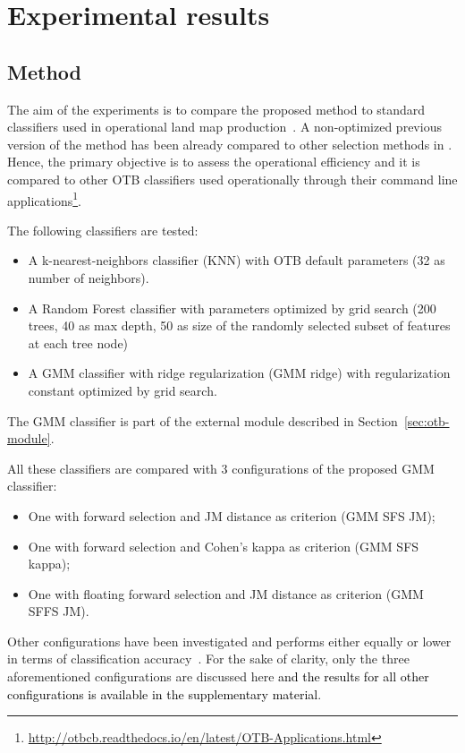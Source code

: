 \documentclass[journal,10pt]{IEEEtran}
\newcommand{\rev}[1]{\textcolor{black}{#1}}
\begin{document}
\section{Experimental results}
\label{sec:test}

    \subsection{Method}
    \label{sec:method}

    The aim  of the experiments is  to compare the proposed  method to
    standard    classifiers    used    in   operational    land    map
    production~\cite{rs70912356}. A non-optimized  previous version of
    the method has been already compared to other selection methods in
    \cite{fauvel2015fast}.  Hence, the primary  objective is to assess
    the  operational  efficiency  and  it is  compared  to  other  OTB
    classifiers   used  operationally   through  their   command  line
    applications\footnote{\url{http://otbcb.readthedocs.io/en/latest/OTB-Applications.html}}.

    The following classifiers are tested:
    \begin{itemize}
        \item A k-nearest-neighbors classifier (KNN) with OTB default parameters (32 as number of neighbors).
        \item A Random Forest classifier with parameters optimized by grid search (200 trees, 40 as max depth, 50 as size of the randomly selected subset of features at each tree node)
        \item A GMM classifier with ridge regularization (GMM ridge) with regularization constant optimized by grid search.
    \end{itemize}
    The GMM classifier is part of the external module described in Section~\ref{sec:otb-module}.

    All these classifiers are compared with 3 configurations of the proposed GMM classifier:
    \begin{itemize}
    \item One with forward selection and JM distance as criterion (GMM SFS JM);
    \item One with forward selection and Cohen's kappa as criterion (GMM SFS kappa);
    \item One with floating forward selection and JM distance as criterion (GMM SFFS JM).
    \end{itemize}
    Other configurations  have been  investigated and  performs either
    equally     or     lower     in    terms     of     classification
    accuracy~\cite{al:report}. For the sake of clarity, only the three
    aforementioned configurations are discussed here \rev{and the results for all other configurations is available in the supplementary material}.
\end{document}
